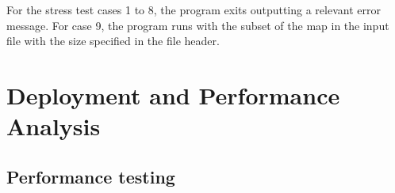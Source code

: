 \documentclass[12pt,a4paper]{article}
\begin{document}
For the stress test cases 1 to 8, the program exits outputting a relevant error message. For case 9, the program runs with the subset of the map in the input file with the size specified in the file header.

\section{Deployment and Performance Analysis}

\subsection{Performance testing} 

%
%
%
%
%
%
%
%
%
%
%
%
%
%
%
%
%
%
\end{document}
